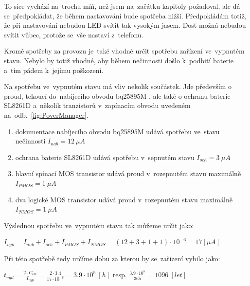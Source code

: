 To sice vychází na~trochu míň, než jsem na~začátku kapitoly požadoval, ale dá se~předpokládat, že během nastavování bude spotřeba nižší.
Předpokládám totiž, že při nastavování nebudou LED svítit tak vysokým jasem.
Dost možná nebudou svítit vůbec, protože se~vše nastaví z~telefonu.


Kromě spotřeby za provozu je~také vhodné určit spotřebu zařízení ve~vypnutém stavu.
Nebylo by totiž vhodné, aby během nečinnosti došlo k~podbití baterie a~tím pádem k~jejímu poškození.

Na spotřebu ve~vypnutém stavu má vliv nekolik součástek.
Jde především o proud, tekoucí do~nabíjecího obvodu bq25895M \cite{BQ25895}, ale také o ochranu baterie SL8261D \cite{SL8261} a~několik tranzistorů v~zapínacím obvodu uvedeném na~odb.~\ref{fig:PoverManager}.

\begin{enumerate}
    \item dokumentace nabíjecího obvodu bq25895M \cite{BQ25895} udává spotřebu ve~stavu nečinnosti \(I_{nab} = 12~\mu A\) 
    \item ochrana baterie SL8261D \cite{SL8261} udává spotřebu v~sepnutém stavu \(I_{och} = 3~\mu A\) 
    \item hlavní spínací MOS transistor \cite{WSD20L75DN33} udává proud v~rozepnutém stavu maximálně \(I_{PMOS} = 1~\mu A\)
    \item dva logické MOS transistor \cite{N-MOS} udává proud v~rozepnutém stavu maximálně \(I_{NMOS} = 1~\mu A\)
\end{enumerate}

Výslednou spotřebu ve~vypnutém stavu tak můžeme určit jako:

\vspace{5mm}
\large
\begin{centering}
\(
    I_{vyp} = I_{nab} + I_{och} + I_{PMOS} + I_{NMOS} = (12 + 3 + 1 + 1) \cdot 10^{-6} = 17 [\mu A]
\)
\end{centering}
\normalsize
\vspace{1mm}

Při této spotřebě tedy určíme dobu za kterou by se~zařízení vybilo jako:

\vspace{5mm}
\large
\begin{centering}
\(
    t_{vyd} = \frac{2 \cdot C_{čla}}{I_{vyp}} = \frac{2 \cdot 3.4}{17 \cdot 10^{-6}} = 3.9\cdot10^{5}~[h] \) resp. \(\frac{3.9\cdot10^{5}}{365} = 1096~[let]\)
\end{centering}
\normalsize
\vspace{1mm}

